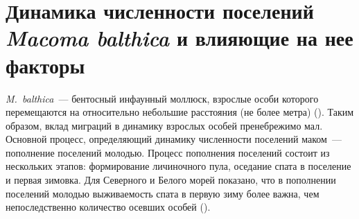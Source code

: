 
		\section{Динамика численности поселений {\it Macoma balthica} и влияющие на нее факторы}


\textit{M.~balthica}~--- бентосный инфаунный моллюск, взрослые особи которого перемещаются на относительно небольшие расстояния (не более метра) (\cite{Beukema_et_al_1993}).
Таким образом, вклад миграций в динамику взрослых особей пренебрежимо мал.
Основной процесс, определяющий динамику численности поселений маком~--- пополнение поселений молодью.
Процесс пополнения поселений состоит из нескольких этапов: формирование личиночного пула, оседание спата в поселение и первая зимовка.
Для Северного и Белого морей показано, что в пополнении поселений молодью выживаемость спата в первую зиму более важна, чем непоследственно количество осевших особей (\cite{Beukema_et_al_1998, Strasser_Gunter_2001, Maximovich_Gerasimova_2004}). 


